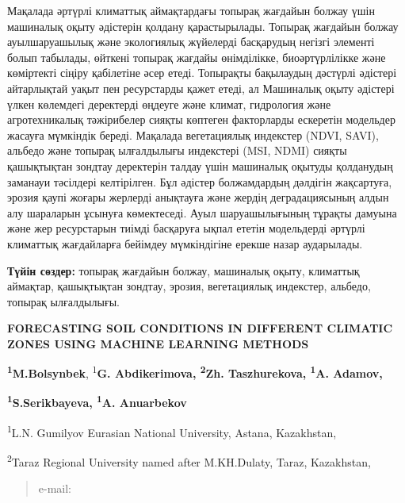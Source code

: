 Мақалада әртүрлі климаттық аймақтардағы топырақ жағдайын болжау үшін
машиналық оқыту әдістерін қолдану қарастырылады. Топырақ жағдайын болжау
ауылшаруашылық және экологиялық жүйелерді басқарудың негізгі элементі
болып табылады, өйткені топырақ жағдайы өнімділікке, биоәртүрлілікке
және көміртекті сіңіру қабілетіне әсер етеді. Топырақты бақылаудың
дәстүрлі әдістері айтарлықтай уақыт пен ресурстарды қажет етеді, ал
Машиналық оқыту әдістері үлкен көлемдегі деректерді өңдеуге және климат,
гидрология және агротехникалық тәжірибелер сияқты көптеген факторларды
ескеретін модельдер жасауға мүмкіндік береді. Мақалада вегетациялық
индекстер (NDVI, SAVI), альбедо және топырақ ылғалдылығы индекстері
(MSI, NDMI) сияқты қашықтықтан зондтау деректерін талдау үшін машиналық
оқытуды қолданудың заманауи тәсілдері келтірілген. Бұл әдістер
болжамдардың дәлдігін жақсартуға, эрозия қаупі жоғары жерлерді анықтауға
және жердің деградациясының алдын алу шараларын ұсынуға көмектеседі.
Ауыл шаруашылығының тұрақты дамуына және жер ресурстарын тиімді
басқаруға ықпал ететін модельдерді әртүрлі климаттық жағдайларға
бейімдеу мүмкіндігіне ерекше назар аударылады.

{\bfseries Түйін сөздер:} топырақ жағдайын болжау, машиналық оқыту,
климаттық аймақтар, қашықтықтан зондтау, эрозия, вегетациялық индекстер,
альбедо, топырақ ылғалдылығы.

{\bfseries FORECASTING SOIL CONDITIONS IN DIFFERENT CLIMATIC ZONES USING
MACHINE LEARNING METHODS}

{\bfseries \textsuperscript{1}M.Bolsynbek}, \textsuperscript{1}{\bfseries G.
Abdikerimova, \textsuperscript{2}Zh. Taszhurekova, \textsuperscript{1}A.
Adamov,}

{\bfseries \textsuperscript{1}S.Serikbayeva\textsuperscript{\envelope },
\textsuperscript{1}A. Anuarbekov}

\textsuperscript{1}L.N. Gumilyov Eurasian National University, Astana,
Kazakhstan,

\textsuperscript{2}Taraz Regional University named after M.KH.Dulaty,
Taraz, Kazakhstan,

\begin{quote}
e-mail: \href{mailto:inf_8585@mail.ru}{}
\end{quote}

